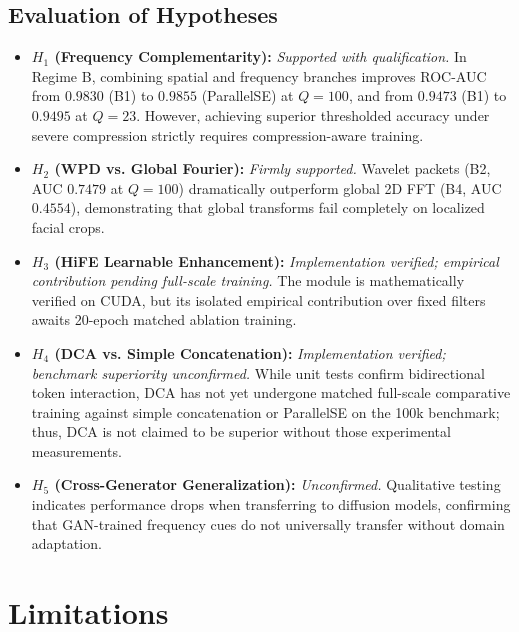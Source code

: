 \documentclass[11pt,a4paper]{article}
\begin{document}
\subsection{Evaluation of Hypotheses}
\begin{itemize}
    \item \textbf{$H_1$ (Frequency Complementarity):} \textit{Supported with qualification.} In Regime B, combining spatial and frequency branches improves ROC-AUC from $0.9830$ (B1) to $0.9855$ (ParallelSE) at $Q=100$, and from $0.9473$ (B1) to $0.9495$ at $Q=23$. However, achieving superior thresholded accuracy under severe compression strictly requires compression-aware training.
    \item \textbf{$H_2$ (WPD vs. Global Fourier):} \textit{Firmly supported.} Wavelet packets (B2, AUC $0.7479$ at $Q=100$) dramatically outperform global 2D FFT (B4, AUC $0.4554$), demonstrating that global transforms fail completely on localized facial crops.
    \item \textbf{$H_3$ (HiFE Learnable Enhancement):} \textit{Implementation verified; empirical contribution pending full-scale training.} The module is mathematically verified on CUDA, but its isolated empirical contribution over fixed filters awaits 20-epoch matched ablation training.
    \item \textbf{$H_4$ (DCA vs. Simple Concatenation):} \textit{Implementation verified; benchmark superiority unconfirmed.} While unit tests confirm bidirectional token interaction, DCA has not yet undergone matched full-scale comparative training against simple concatenation or ParallelSE on the 100k benchmark; thus, DCA is not claimed to be superior without those experimental measurements.
    \item \textbf{$H_5$ (Cross-Generator Generalization):} \textit{Unconfirmed.} Qualitative testing indicates performance drops when transferring to diffusion models, confirming that GAN-trained frequency cues do not universally transfer without domain adaptation.
\end{itemize}

\section{Limitations}
\label{sec:limitations}
\end{document}
